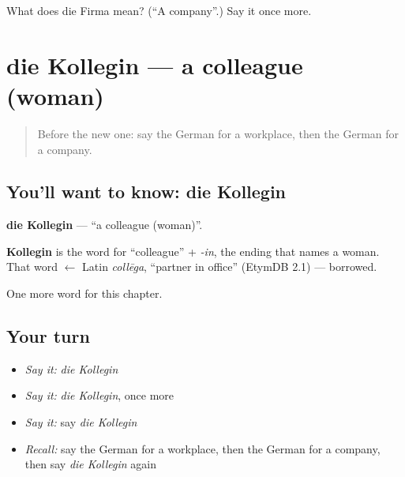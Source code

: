 \begin{tcolorbox}[breakable,colback=teal!4,colframe=teal!35!black,title={Before you move on}]
What does die Firma mean? (\textquotedblleft{}A company\textquotedblright{}.) Say it once more.
\end{tcolorbox}
\section[die Kollegin]{die Kollegin — a colleague (woman)}

\label{lesson:GE-C154-kollegin}



\begin{quote}
Before the new one: say the German for a workplace, then the German for a company.
\end{quote}

\subsection*{You'll want to know: die Kollegin}
\textbf{die Kollegin} — \textquotedblleft{}a colleague (woman)\textquotedblright{}.

\begin{cousinweb}
\textbf{Kollegin} is the word for \textquotedblleft{}colleague\textquotedblright{} + \emph{-in}, the ending that names a woman. That word $\leftarrow$ Latin \emph{collēga}, \textquotedblleft{}partner in office\textquotedblright{} (EtymDB 2.1) — borrowed.
\end{cousinweb}

\begin{grammarlens}[title={What you've built}]
One more word for this chapter.
\end{grammarlens}

\subsection*{Your turn}
\begin{itemize}
\raggedright
  \item \emph{Say it:} \emph{die Kollegin}
  \item \emph{Say it:} \emph{die Kollegin}, once more
  \item \emph{Say it:} say \emph{die Kollegin}
  \item \emph{Recall:} say the German for a workplace, then the German for a company, then say \emph{die Kollegin} again
\end{itemize}

